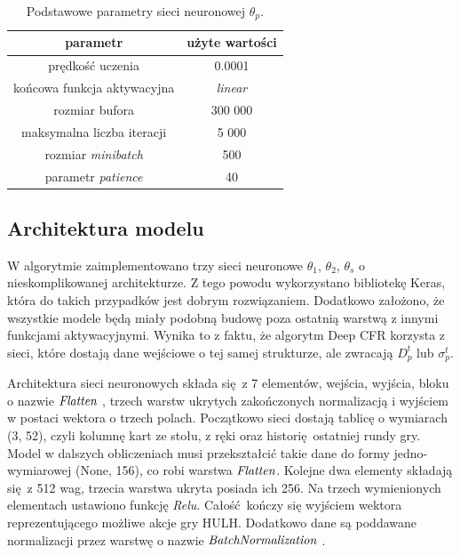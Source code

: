 \documentclass[12pt,oneside,a4paper]{report}
\begin{document}
\begin{table}[h!]
\centering
\caption{Podstawowe parametry sieci neuronowej $\theta_{p}$.}
\begin{tabular}{|c|c| }
   \hline
   parametr & użyte wartości \\
    \hline
   prędkość uczenia & 0.0001 \\
   \hline
   końcowa funkcja aktywacyjna & \emph{linear} \\
   \hline
   rozmiar bufora & 300 000 \\
   \hline
   maksymalna liczba iteracji & 5 000 \\
   \hline
   rozmiar \emph{minibatch} &  500\\
   \hline
   parametr \emph{patience} &  40\\
   \hline
\end{tabular}
\end{table}

\vspace{5cm}
\subsection{Architektura modelu}

W algorytmie zaimplementowano trzy sieci neuronowe $\theta_{1}$, $\theta_{2}$, $\theta_{s}$ o nieskomplikowanej architekturze. Z tego powodu
wykorzystano bibliotekę Keras, która do takich przypadków jest dobrym rozwiązaniem. 
Dodatkowo
założono, że
wszystkie modele będą miały podobną budowę poza ostatnią warstwą z innymi funkcjami
aktywacyjnymi. Wynika to z faktu, że algorytm Deep CFR korzysta z sieci, które dostają dane wejściowe
o tej samej strukturze, ale zwracają $D_{p}^{t}$ lub $\sigma_{p}^{t}$.

Architektura sieci neuronowych składa się z 7 elementów, wejścia, wyjścia, bloku o nazwie
$\emph{Flatten}$ \cite{tensorflow}, 
trzech warstw ukrytych zakończonych normalizacją i wyjściem w postaci wektora o trzech polach.
Początkowo sieci dostają tablicę o wymiarach (3, 52), czyli kolumnę kart ze stołu, z ręki oraz
historię ostatniej rundy gry. Model w dalszych obliczeniach musi
przekształcić takie dane do formy jedno-wymiarowej (None, 156), co robi warstwa $\emph{Flatten}$.
Kolejne dwa elementy składają się z 512 wag, trzecia warstwa ukryta posiada ich 256.
Na trzech wymienionych elementach ustawiono funkcję \emph{Relu}. 
Całość kończy się wyjściem wektora reprezentującego możliwe akcje gry HULH.
Dodatkowo dane są poddawane normalizacji przez warstwę o nazwie $\emph{BatchNormalization}$
\cite{tensorflow}.
\end{document}
